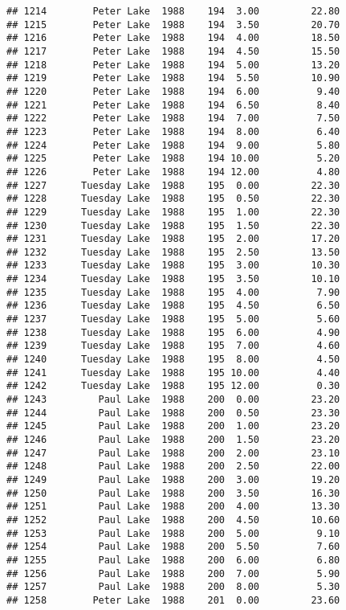 \documentclass[
]{article}
\begin{document}
\begin{verbatim}
## 1214        Peter Lake  1988    194  3.00         22.80
## 1215        Peter Lake  1988    194  3.50         20.70
## 1216        Peter Lake  1988    194  4.00         18.50
## 1217        Peter Lake  1988    194  4.50         15.50
## 1218        Peter Lake  1988    194  5.00         13.20
## 1219        Peter Lake  1988    194  5.50         10.90
## 1220        Peter Lake  1988    194  6.00          9.40
## 1221        Peter Lake  1988    194  6.50          8.40
## 1222        Peter Lake  1988    194  7.00          7.50
## 1223        Peter Lake  1988    194  8.00          6.40
## 1224        Peter Lake  1988    194  9.00          5.80
## 1225        Peter Lake  1988    194 10.00          5.20
## 1226        Peter Lake  1988    194 12.00          4.80
## 1227      Tuesday Lake  1988    195  0.00         22.30
## 1228      Tuesday Lake  1988    195  0.50         22.30
## 1229      Tuesday Lake  1988    195  1.00         22.30
## 1230      Tuesday Lake  1988    195  1.50         22.30
## 1231      Tuesday Lake  1988    195  2.00         17.20
## 1232      Tuesday Lake  1988    195  2.50         13.50
## 1233      Tuesday Lake  1988    195  3.00         10.30
## 1234      Tuesday Lake  1988    195  3.50         10.10
## 1235      Tuesday Lake  1988    195  4.00          7.90
## 1236      Tuesday Lake  1988    195  4.50          6.50
## 1237      Tuesday Lake  1988    195  5.00          5.60
## 1238      Tuesday Lake  1988    195  6.00          4.90
## 1239      Tuesday Lake  1988    195  7.00          4.60
## 1240      Tuesday Lake  1988    195  8.00          4.50
## 1241      Tuesday Lake  1988    195 10.00          4.40
## 1242      Tuesday Lake  1988    195 12.00          0.30
## 1243         Paul Lake  1988    200  0.00         23.20
## 1244         Paul Lake  1988    200  0.50         23.30
## 1245         Paul Lake  1988    200  1.00         23.20
## 1246         Paul Lake  1988    200  1.50         23.20
## 1247         Paul Lake  1988    200  2.00         23.10
## 1248         Paul Lake  1988    200  2.50         22.00
## 1249         Paul Lake  1988    200  3.00         19.20
## 1250         Paul Lake  1988    200  3.50         16.30
## 1251         Paul Lake  1988    200  4.00         13.30
## 1252         Paul Lake  1988    200  4.50         10.60
## 1253         Paul Lake  1988    200  5.00          9.10
## 1254         Paul Lake  1988    200  5.50          7.60
## 1255         Paul Lake  1988    200  6.00          6.80
## 1256         Paul Lake  1988    200  7.00          5.90
## 1257         Paul Lake  1988    200  8.00          5.30
## 1258        Peter Lake  1988    201  0.00         23.60

\end{verbatim}
\end{document}

